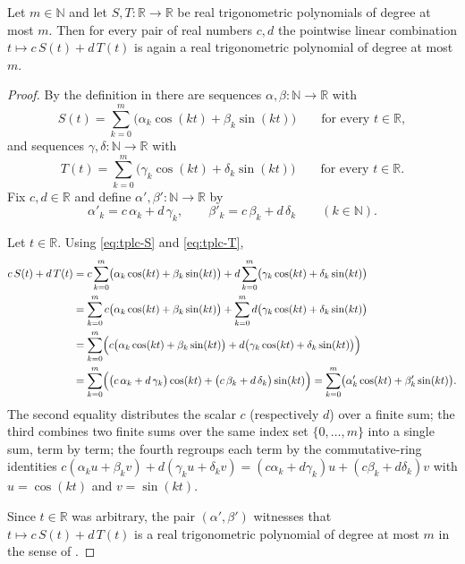 \begin{lemma}
Let $m\in\mathbb{N}$ and let $S,T:\mathbb{R}\to\mathbb{R}$ be real
trigonometric polynomials of degree at most $m$. Then for every pair of real
numbers $c,d$ the pointwise linear combination $t\mapsto c\,S(t)+d\,T(t)$ is
again a real trigonometric polynomial of degree at most $m$.
\end{lemma}
\begin{proof}
By the definition in  there are sequences
$\alpha,\beta:\mathbb{N}\to\mathbb{R}$ with
\begin{equation}\label{eq:tplc-S}
  S(t)=\sum_{k=0}^{m}\bigl(\alpha_k\cos(kt)+\beta_k\sin(kt)\bigr)
  \qquad\text{for every }t\in\mathbb{R},
\end{equation}
and sequences $\gamma,\delta:\mathbb{N}\to\mathbb{R}$ with
\begin{equation}\label{eq:tplc-T}
  T(t)=\sum_{k=0}^{m}\bigl(\gamma_k\cos(kt)+\delta_k\sin(kt)\bigr)
  \qquad\text{for every }t\in\mathbb{R}.
\end{equation}
Fix $c,d\in\mathbb{R}$ and define $\alpha',\beta':\mathbb{N}\to\mathbb{R}$ by
\[
  \alpha'_k=c\,\alpha_k+d\,\gamma_k,
  \qquad
  \beta'_k=c\,\beta_k+d\,\delta_k
  \qquad(k\in\mathbb{N}).
\]

Let $t\in\mathbb{R}$. Using \eqref{eq:tplc-S} and \eqref{eq:tplc-T},
\begin{align*}
  c\,S(t)+d\,T(t)
  &=c\sum_{k=0}^{m}\bigl(\alpha_k\cos(kt)+\beta_k\sin(kt)\bigr)
   +d\sum_{k=0}^{m}\bigl(\gamma_k\cos(kt)+\delta_k\sin(kt)\bigr)\\
  &=\sum_{k=0}^{m}c\bigl(\alpha_k\cos(kt)+\beta_k\sin(kt)\bigr)
   +\sum_{k=0}^{m}d\bigl(\gamma_k\cos(kt)+\delta_k\sin(kt)\bigr)\\
  &=\sum_{k=0}^{m}\Bigl(c\bigl(\alpha_k\cos(kt)+\beta_k\sin(kt)\bigr)
     +d\bigl(\gamma_k\cos(kt)+\delta_k\sin(kt)\bigr)\Bigr)\\
  &=\sum_{k=0}^{m}\Bigl(\bigl(c\,\alpha_k+d\,\gamma_k\bigr)\cos(kt)
     +\bigl(c\,\beta_k+d\,\delta_k\bigr)\sin(kt)\Bigr)
  =\sum_{k=0}^{m}\bigl(\alpha'_k\cos(kt)+\beta'_k\sin(kt)\bigr).
\end{align*}
The second equality distributes the scalar $c$ (respectively $d$) over a finite
sum; the third combines two finite sums over the same index set
$\{0,\dots,m\}$ into a single sum, term by term; the fourth regroups each term
by the commutative-ring identities
$c(\alpha_k u+\beta_k v)+d(\gamma_k u+\delta_k v)
 =(c\alpha_k+d\gamma_k)u+(c\beta_k+d\delta_k)v$
with $u=\cos(kt)$ and $v=\sin(kt)$.

Since $t\in\mathbb{R}$ was arbitrary, the pair $(\alpha',\beta')$ witnesses that
$t\mapsto c\,S(t)+d\,T(t)$ is a real trigonometric polynomial of degree at most
$m$ in the sense of .
\end{proof}
